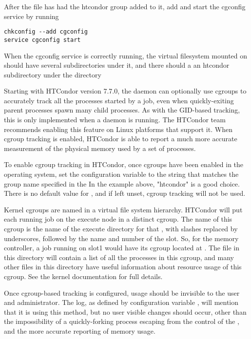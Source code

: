 After the  file has had the htcondor group
added to it, add and start the cgconfig service by running

\begin{verbatim}
chkconfig --add cgconfig
service cgconfig start
\end{verbatim}

When the cgconfig service is correctly running, the virtual filesystem
mounted on  should have several subdirectories under it, and
there should a an htcondor subdirectory under the directory 

Starting with HTCondor version 7.7.0, 
the  daemon can optionally use cgroups
to accurately track all the processes started by a job, 
even when quickly-exiting parent processes spawn many child processes.
As with the GID-based tracking, this is only implemented when a 
 daemon is running.  The HTCondor team recommends enabling 
this feature on Linux platforms that support it.  When cgroup tracking is enabled, 
HTCondor is able to report a much more accurate
measurement of the physical memory used by a set of processes.

To enable cgroup tracking in HTCondor, once cgroups have been enabled
in the operating system, set the  configuration
variable to the string that matches the group name specified in the 
In the example above, "htcondor" is a good choice.  There is no default value
for , and if left unset, cgroup tracking will not be used.

Kernel cgroups are named in a virtual file system hierarchy. 
HTCondor will put each running job on the execute node in a distinct cgroup.
The name of this cgroup is the name of the execute directory for that , with
slashes replaced by underscores, followed by the name and number of the slot.  So, for the
memory controller, a job running on slot1 would have its cgroup located at
.  The 
file in this directory will contain a list of all the processes in this cgroup, and
many other files in this directory have useful information about resource usage
of this cgroup.  See the kernel documentation for full details.

Once cgroup-based tracking is configured, 
usage should be invisible to the user and administrator.  
The  log, as defined by configuration variable
, 
will mention that it is using this method, 
but no user visible changes should occur,
other than the impossibility of a quickly-forking process escaping from the
control of the ,
and the more accurate reporting of memory usage.

